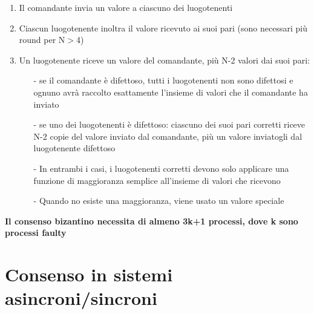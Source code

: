 \documentclass[12pt,italian]{report}
\begin{document}
\begin{enumerate}
    \item Il comandante invia un valore a ciascuno dei luogotenenti
    \item Ciascun luogotenente inoltra il valore ricevuto ai suoi pari (sono necessari più round per N$>$4)
    \item Un luogotenente riceve un valore del comandante, più N-2 valori dai suoi pari:
    \begin{itemize}
        \item [-] se il comandante è difettoso, tutti i luogotenenti non sono difettosi e ognuno avrà raccolto esattamente l'insieme di valori che il comandante ha inviato
        \item[-]  se uno dei luogotenenti è difettoso: ciascuno dei suoi pari corretti riceve N-2 copie del valore inviato dal comandante, più un valore inviatogli dal luogotenente difettoso
        \item[-] In entrambi i casi, i luogotenenti corretti devono solo applicare una funzione di maggioranza semplice all'insieme di valori che ricevono
        \item[-] Quando no esiste una maggioranza, viene usato un valore speciale
    \end{itemize}
\end{enumerate}
\noindent \textbf{Il consenso bizantino necessita di almeno 3k+1 processi, dove k sono processi faulty}

\section{Consenso in sistemi asincroni/sincroni}
\end{document}

